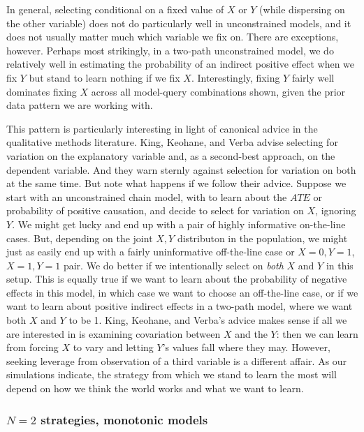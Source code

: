 \documentclass[
  12pt,
]{book}
\begin{document}
In general, selecting conditional on a fixed value of \(X\) or \(Y\) (while dispersing on the other variable) does not do particularly well in unconstrained models, and it does not usually matter much which variable we fix on. There are exceptions, however. Perhaps most strikingly, in a two-path unconstrained model, we do relatively well in estimating the probability of an indirect positive effect when we fix \(Y\) but stand to learn nothing if we fix \(X\). Interestingly, fixing \(Y\) fairly well dominates fixing \(X\) across all model-query combinations shown, given the prior data pattern we are working with.

This pattern is particularly interesting in light of canonical advice in the qualitative methods literature. King, Keohane, and Verba \citeyearpar{king1994designing} advise selecting for variation on the explanatory variable and, as a second-best approach, on the dependent variable. And they warn sternly against selection for variation on both at the same time. But note what happens if we follow their advice. Suppose we start with an unconstrained chain model, with to learn about the \(ATE\) or probability of positive causation, and decide to select for variation on \(X\), ignoring \(Y\). We might get lucky and end up with a pair of highly informative on-the-line cases. But, depending on the joint \(X,Y\) distributon in the population, we might just as easily end up with a fairly uninformative off-the-line case or \(X=0, Y=1\), \(X=1, Y=1\) pair. We do better if we intentionally select on \emph{both} \(X\) and \(Y\) in this setup. This is equally true if we want to learn about the probability of negative effects in this model, in which case we want to choose an off-the-line case, or if we want to learn about positive indirect effects in a two-path model, where we want both \(X\) and \(Y\) to be 1. King, Keohane, and Verba's advice makes sense if all we are interested in is examining covariation between \(X\) and the \(Y\): then we can learn from forcing \(X\) to vary and letting \(Y\)'s values fall where they may. However, seeking leverage from observation of a third variable is a different affair. As our simulations indicate, the strategy from which we stand to learn the most will depend on how we think the world works and what we want to learn.

\hypertarget{n2-strategies-monotonic-models}{%
\subsubsection{\texorpdfstring{\(N=2\) strategies, monotonic models}{N=2 strategies, monotonic models}}\label{n2-strategies-monotonic-models}}
\end{document}
